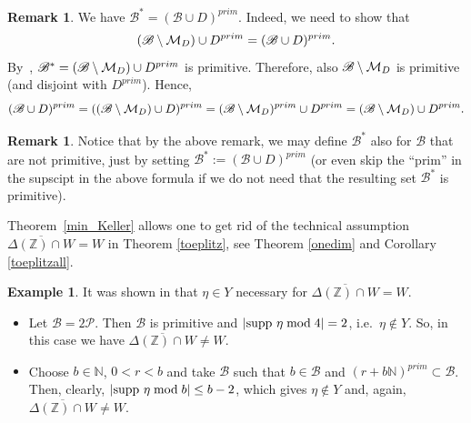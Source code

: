 \documentclass[leqno,a4paper,12pt]{article}
\theoremstyle{definition}
\newtheorem{Remark}[Th]{Remark}
\newtheorem{Example}[Th]{Example}
\newcommand{\cm}{{\cal M}}
\newcommand{\ov}{\overline}
\newcommand{\Z}{{\mathbb{Z}}}
\newcommand{\N}{{\mathbb{N}}}
\newcommand{\sB}{\mathscr{B}}
\def\supp{{\rm supp }}
\begin{document}
\begin{Remark}\label{B*}
We have $\sB^*=(\sB\cup D)^{prim}$. Indeed, we need to show that
\[
(\sB\setminus\cm_D)\cup D^{prim}=(\sB\cup D)^{prim}.
\]
By~\cite[Lemma 3 a)]{MR4280951}, $\mathscr{B}^*=(\sB\setminus\cm_D)\cup D^{prim}$ is primitive. Therefore, also $\sB\setminus\cm_D$ is primitive (and disjoint with $D^{prim}$). Hence,
\[
(\sB\cup D)^{prim}=((\sB\setminus\cm_D)\cup D)^{prim}=(\sB\setminus\cm_D)^{prim}\cup D^{prim}=(\sB\setminus\cm_D)\cup D^{prim}.
\]
\end{Remark}
\begin{Remark}
Notice that by the above remark, we may define $\sB^*$ also for $\sB$ that are not primitive, just by setting $\sB^*:=(\sB\cup D)^{prim}$ (or even skip the ``prim'' in the supscipt in the above formula if we do not need that the resulting set $\sB^*$ is primitive).
\end{Remark}


Theorem~\ref{min_Keller} allows one to get rid of the technical assumption $\overline{\Delta(\mathbb{Z}) \cap W}=W$ in Theorem \ref{toeplitz}, see Theorem \ref{onedim} and Corollary \ref{toeplitzall}.
\begin{Example}
It was shown in \cite[Lemma 3.6]{MR3947636} that $\eta\in Y$ necessary for $\ov{\Delta(\Z)\cap W}=W$.
\begin{itemize}
\item
Let $\mathscr{B}=2\mathcal{P}$. Then $\mathscr{B}$ is primitive and $|\supp\ \eta \bmod 4|=2$, i.e.\ $\eta\not\in Y$. So, in this case we have $\ov{\Delta(\Z)\cap W}\neq W$.
\item
Choose $b\in\N$, $0<r<b$ and take $\mathscr{B}$ such that $b\in\mathscr{B}$ and $(r+b\N)^{prim}\subset \mathscr{B}$. Then, clearly, $|\supp\ \eta \bmod b|\leq b-2$, which gives $\eta\not\in Y$ and, again, $\ov{\Delta(\Z)\cap W}\neq W$.
\end{itemize}
\end{Example}
\end{document}
